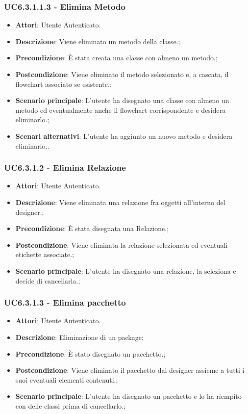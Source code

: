 \subsubsection{UC6.3.1.1.3 - Elimina Metodo} 
\label{sssec:UC6.3.1.1.3} 
\begin{itemize} 
\item \textbf{Attori}: Utente Autenticato.
\item \textbf{Descrizione}: Viene eliminato un metodo della classe.;
\item \textbf{Precondizione}: È stata creata una classe con almeno un metodo.;
\item \textbf{Postcondizione}: Viene eliminato il metodo selezionato e, a cascata, il flowchart associato se esistente.;
\item \textbf{Scenario principale}: L'utente ha disegnato una classe con almeno un metodo ed  eventualmente anche il flowchart corrispondente e desidera eliminarlo.;\item \textbf{Scenari alternativi}: L'utente ha aggiunto un nuovo metodo e desidera eliminarlo..
\end{itemize} 
\subsubsection{UC6.3.1.2 - Elimina Relazione} 
\label{sssec:UC6.3.1.2} 
\begin{itemize} 
\item \textbf{Attori}: Utente Autenticato.
\item \textbf{Descrizione}: Viene eliminata una relazione fra oggetti all'interno del designer.;
\item \textbf{Precondizione}: È stata disegnata una Relazione.;
\item \textbf{Postcondizione}: Viene eliminata la relazione selezionata ed eventuali etichette associate.;
\item \textbf{Scenario principale}: L'utente ha disegnato una relazione, la seleziona e decide di cancellarla.;\end{itemize} 
\subsubsection{UC6.3.1.3 - Elimina pacchetto} 
\label{sssec:UC6.3.1.3} 
\begin{itemize} 
\item \textbf{Attori}: Utente Autenticato.
\item \textbf{Descrizione}: Eliminazione di un package;
\item \textbf{Precondizione}: È stato disegnato un pacchetto.;
\item \textbf{Postcondizione}: Viene eliminato il pacchetto dal designer assieme a tutti i suoi eventuali elementi contenuti.;
\item \textbf{Scenario principale}: L'utente ha disegnato un pacchetto e lo ha riempito con delle classi prima di cancellarlo.;\end{itemize} 
